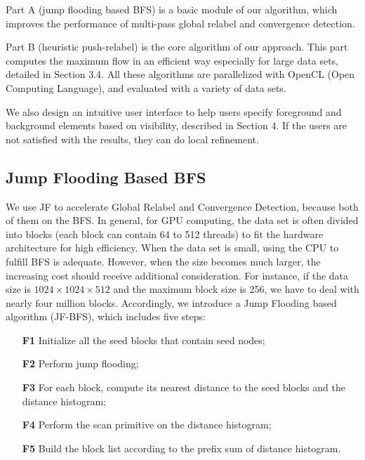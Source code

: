 Part A (jump flooding based BFS) is a basic module of our algorithm, which improves the performance of multi-pass global relabel and convergence detection.

Part B (heuristic push-relabel) is the core algorithm of our approach.
This part computes the maximum flow in an efficient way especially for large data sets, detailed in Section 3.4.
All these algorithms are parallelized with OpenCL (Open Computing Language), and evaluated with a variety of data sets.

We also design an intuitive user interface to help users specify foreground and background elements based on visibility, described in Section 4.
If the users are not satisfied with the results, they can do local refinement.

\subsection{Jump Flooding Based BFS}

We use JF to accelerate Global Relabel and Convergence Detection, because both of them on the BFS.
In general, for GPU computing, the data set is often divided into blocks (each block can contain 64 to 512 threads) to fit the hardware architecture for high efficiency.
When the data set is small, using the CPU to fulfill BFS is adequate. However, when the size becomes much larger, the increasing cost should receive additional consideration.
For instance, if the data size is $1024 \times 1024 \times 512$ and the maximum block size is 256, we have to deal with nearly four million blocks.
Accordingly, we introduce a Jump Flooding based algorithm (JF-BFS), which includes five steps:

{
\small
\begin{enumerate}
\item[\textbf{F1}] Initialize all the seed blocks that contain seed nodes;
\item[\textbf{F2}] Perform jump flooding;
\item[\textbf{F3}] For each block, compute its nearest distance to the seed blocks and the distance histogram;
\item[\textbf{F4}] Perform the scan primitive on the distance histogram;
\item[\textbf{F5}] Build the block list according to the prefix sum of distance histogram.
\end{enumerate}
}


